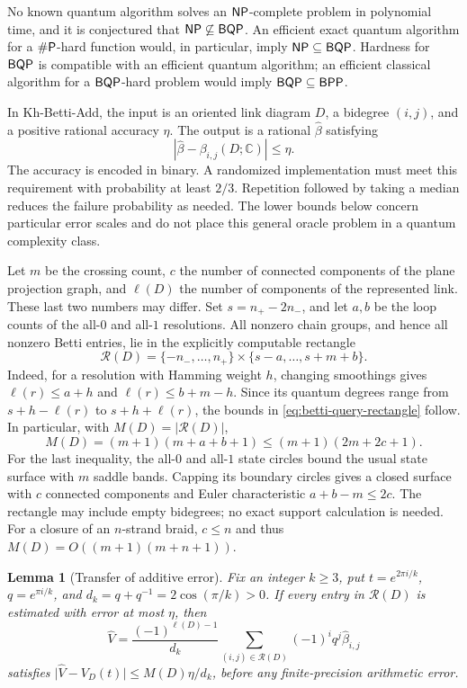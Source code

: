 \documentclass[a4paper,onecolumn,unpublished]{quantumarticle}
\theoremstyle{plain}
\newtheorem{lemma}[theorem]{Lemma}
\theoremstyle{definition}
\theoremstyle{definition}
\numberwithin{equation}{section}
\begin{document}
No known quantum algorithm solves an \(\mathsf{NP}\)-complete problem in polynomial time, and it is conjectured that \(\mathsf{NP}\not\subseteq\mathsf{BQP}\). An efficient exact quantum algorithm for a \(\#\mathsf{P}\)-hard function would, in particular, imply \(\mathsf{NP}\subseteq\mathsf{BQP}\). Hardness for \(\mathsf{BQP}\) is compatible with an efficient quantum algorithm; an efficient classical algorithm for a \(\mathsf{BQP}\)-hard problem would imply \(\mathsf{BQP}\subseteq\mathsf{BPP}\).

In \textsf{Kh-Betti-Add}, the input is an oriented link diagram \(D\), a bidegree \((i,j)\), and a positive rational accuracy \(\eta\). The output is a rational \(\widehat\beta\) satisfying
\[
 |\widehat\beta-\beta_{i,j}(D;\mathbb C)|\le\eta.
\]
The accuracy is encoded in binary. A randomized implementation must meet this requirement with probability at least \(2/3\). Repetition followed by taking a median reduces the failure probability as needed. The lower bounds below concern particular error scales and do not place this general oracle problem in a quantum complexity class.

Let \(m\) be the crossing count, \(c\) the number of connected components of the plane projection graph, and \(\ell(D)\) the number of components of the represented link. These last two numbers may differ. Set \(s=n_+-2n_-\), and let \(a,b\) be the loop counts of the all-\(0\) and all-\(1\) resolutions. All nonzero chain groups, and hence all nonzero Betti entries, lie in the explicitly computable rectangle
\begin{equation}
 \mathcal R(D)=\{-n_-,\ldots,n_+\}
 \times\{s-a,\ldots,s+m+b\}.
 \label{eq:betti-query-rectangle}
\end{equation}
Indeed, for a resolution with Hamming weight \(h\), changing smoothings gives \(\ell(r)\le a+h\) and \(\ell(r)\le b+m-h\). Since its quantum degrees range from \(s+h-\ell(r)\) to \(s+h+\ell(r)\), the bounds in \cref{eq:betti-query-rectangle} follow. In particular, with \(M(D)=|\mathcal R(D)|\),
\[
 M(D)=(m+1)(m+a+b+1)
 \le(m+1)(2m+2c+1).
\]
For the last inequality, the all-\(0\) and all-\(1\) state circles bound the usual state surface with \(m\) saddle bands. Capping its boundary circles gives a closed surface with \(c\) connected components and Euler characteristic \(a+b-m\le2c\). The rectangle may include empty bidegrees; no exact support calculation is needed. For a closure of an \(n\)-strand braid, \(c\le n\) and thus \(M(D)=O((m+1)(m+n+1))\).

\begin{lemma}[Transfer of additive error]
\label{lem:transfer}
Fix an integer \(k\ge3\), put \(t=e^{2\pi i/k}\), \(q=e^{\pi i/k}\), and \(d_k=q+q^{-1}=2\cos(\pi/k)>0\). If every entry in \(\mathcal R(D)\) is estimated with error at most \(\eta\), then
\[
 \widehat V=
 \frac{(-1)^{\ell(D)-1}}{d_k}
 \sum_{(i,j)\in\mathcal R(D)}(-1)^i q^j\widehat\beta_{i,j}
\]
satisfies \(\lvert\widehat V-V_D(t)\rvert\le M(D)\eta/d_k\), before any finite-precision arithmetic error.
\end{lemma}
\end{document}
